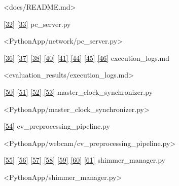 \documentclass[12pt,a4paper]{article}
\begin{document}
\textless docs/README.md\textgreater{}

\href{PythonApp/network/pc_server.py\#L44-L53}{{[}32{]}} \href{PythonApp/network/pc_server.py\#L90-L98}{{[}33{]}} pc\_server.py

\textless PythonApp/network/pc\_server.py\textgreater{}

\href{evaluation_results/execution_logs.md\#L16-L24}{{[}36{]}} \href{evaluation_results/execution_logs.md\#L38-L46}{{[}37{]}} \href{evaluation_results/execution_logs.md\#L104-L113}{{[}38{]}} \href{evaluation_results/execution_logs.md\#L40-L48}{{[}40{]}} \href{evaluation_results/execution_logs.md\#L50-L58}{{[}41{]}} \href{evaluation_results/execution_logs.md\#L62-L70}{{[}44{]}} \href{evaluation_results/execution_logs.md\#L72-L75}{{[}45{]}} \href{evaluation_results/execution_logs.md\#L140-L146}{{[}46{]}} execution\_logs.md

\textless evaluation\_results/execution\_logs.md\textgreater{}

\href{PythonApp/master_clock_synchronizer.py\#L86-L94}{{[}50{]}} \href{PythonApp/master_clock_synchronizer.py\#L95-L102}{{[}51{]}} \href{PythonApp/master_clock_synchronizer.py\#L86-L102}{{[}52{]}} \href{PythonApp/master_clock_synchronizer.py\#L164-L172}{{[}53{]}} master\_clock\_synchronizer.py

\textless PythonApp/master\_clock\_synchronizer.py\textgreater{}

\href{PythonApp/webcam/cv_preprocessing_pipeline.py\#L72-L80}{{[}54{]}} cv\_preprocessing\_pipeline.py

\textless PythonApp/webcam/cv\_preprocessing\_pipeline.py\textgreater{}

\href{PythonApp/shimmer_manager.py\#L241-L249}{{[}55{]}} \href{PythonApp/shimmer_manager.py\#L250-L258}{{[}56{]}} \href{PythonApp/shimmer_manager.py\#L241-L258}{{[}57{]}} \href{PythonApp/shimmer_manager.py\#L134-L143}{{[}58{]}} \href{PythonApp/shimmer_manager.py\#L269-L278}{{[}59{]}} \href{PythonApp/shimmer_manager.py\#L280-L289}{{[}60{]}} \href{PythonApp/shimmer_manager.py\#L145-L151}{{[}61{]}} shimmer\_manager.py

\textless PythonApp/shimmer\_manager.py\textgreater{}

\newpage
\end{document}
